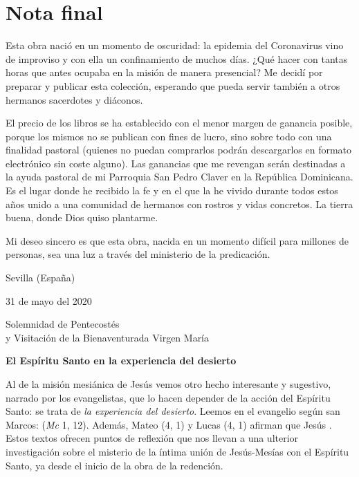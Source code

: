 			\chapter{Nota final}

Esta obra nació en un momento de oscuridad: la epidemia del Coronavirus vino de improviso y con ella un confinamiento de muchos días. ¿Qué hacer con tantas horas que antes ocupaba en la misión de manera presencial? Me decidí por preparar y publicar esta colección, esperando que pueda servir también a otros hermanos sacerdotes y diáconos.

El precio de los libros se ha establecido con el menor margen de ganancia posible, porque los mismos no se publican con fines de lucro, sino sobre todo con una finalidad pastoral (quienes no puedan comprarlos podrán descargarlos en formato electrónico sin coste alguno). Las ganancias que me revengan serán destinadas a la ayuda pastoral de mi Parroquia San Pedro Claver en la República Dominicana. Es el lugar donde he recibido la fe y en el que la he vivido durante todos estos años unido a una comunidad de hermanos con rostros y vidas concretos. La tierra buena, donde Dios quiso plantarme.

Mi deseo sincero es que esta obra, nacida en un momento difícil para millones de personas, sea una luz a través del ministerio de la predicación.

Sevilla (España)

31 de mayo del 2020

Solemnidad de Pentecostés \\y Visitación de la Bienaventurada Virgen María

\begin{patercite}\textbf{El Espíritu Santo en la experiencia del desierto}\end{patercite}

\begin{patercite}Al  de la misión mesiánica de Jesús vemos otro hecho interesante y sugestivo, narrado por los evangelistas, que lo hacen depender de la acción del Espíritu Santo: se trata de \textit{la experiencia del desierto}. Leemos en el evangelio según san Marcos:  (\textit{Mc} 1, 12). Además, Mateo (4, 1) y Lucas (4, 1) afirman que Jesús . Estos textos ofrecen puntos de reflexión que nos llevan a una ulterior investigación sobre el misterio de la íntima unión de Jesús-Mesías con el Espíritu Santo, ya desde el inicio de la obra de la redención.\end{patercite}

